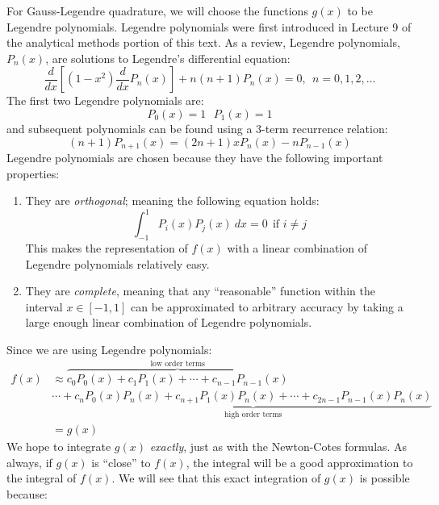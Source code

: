 For Gauss-Legendre quadrature, we will choose the functions $g(x)$ to be Legendre polynomials.  Legendre polynomials were first introduced in Lecture 9 of the analytical methods portion of this text.  As a review, Legendre polynomials,$P_n(x)$, are solutions to Legendre's differential equation:
\begin{equation}
\frac{d}{dx}\left[\left(1-x^2\right)\frac{d}{dx}P_n(x)\right] + n(n+1)P_n(x) = 0, \ \ n=0,1,2,\dots
\end{equation}
The first two Legendre polynomials are:
\begin{equation*}
P_0(x) = 1 \ \ \ P_1(x) = 1
\end{equation*}
and subsequent polynomials can be found using a 3-term recurrence relation:
\begin{equation}
(n+1)P_{n+1}(x) = (2n+1)xP_n(x)-nP_{n-1}(x)
\end{equation}
Legendre polynomials are chosen because they have the following important properties:
\begin{enumerate}
\item They are \emph{orthogonal}; meaning the following equation holds:
\begin{equation*}
\int_{-1}^{1}P_i(x)P_j(x) \ dx = 0 \ \ \text{if } i \ne j
\end{equation*}
This makes the representation of $f(x)$ with a linear combination of Legendre polynomials relatively easy.
\item They are \emph{complete}, meaning that any ``reasonable'' function within the interval $x\in[-1,1]$ can be approximated to arbitrary accuracy by taking a large enough linear combination of Legendre polynomials.
\end{enumerate}
Since we are using Legendre polynomials:
\begin{align*}
f(x) &\approx \overbrace{c_0 P_0(x) + c_1P_1(x) + \cdots + c_{n-1}P_{n-1}(x)}^{\text{low order terms}} \\ 
&\cdots + \underbrace{c_{n}P_0(x)P_{n}(x) + c_{n+1}P_1(x)P_n(x) + \cdots + c_{2n-1}P_{n-1}(x)P_{n}(x)}_{\text{high order terms}} \\
&= g(x)
\end{align*}
We hope to integrate $g(x)$ \emph{exactly}, just as with the Newton-Cotes formulas.  As always, if $g(x)$ is ``close'' to $f(x)$, the integral will be a good approximation to the integral of $f(x)$.  We will see that this exact integration of $g(x)$ is possible because:
